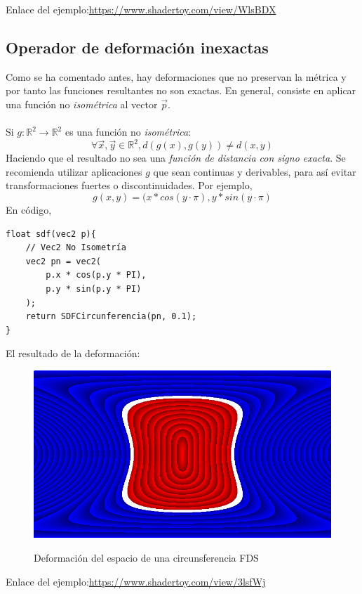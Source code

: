 Enlace del ejemplo:\url{https://www.shadertoy.com/view/WlsBDX}

\subsection{Operador de deformación inexactas}
Como se ha comentado antes, hay deformaciones que no preservan la métrica y por tanto las funciones resultantes no son exactas. En general, consiste en aplicar una función no \textit{isométrica} al vector \(\Vec{p}\).\\\\
Si \(g:\mathbb{R}^2\longrightarrow \mathbb{R}^2\) es una función no \textit{isométrica}:
\[ \forall \Vec{x}, \Vec{y} \in \mathbb{R}^2, d(g(x), g(y)) \neq d(x,y) \]
Haciendo que el resultado no sea una \textit{función de distancia con signo exacta}. Se recomienda utilizar aplicaciones \(g\) que sean continuas y derivables, para así evitar transformaciones fuertes o discontinuidades. Por ejemplo,
\[g(x,y)=(x * cos(y \cdot \pi), y * sin(y \cdot \pi)\]
En código,
\begin{lstlisting}
float sdf(vec2 p){
	// Vec2 No Isometría
	vec2 pn = vec2(
	    p.x * cos(p.y * PI),
	    p.y * sin(p.y * PI)
	);
	return SDFCircunferencia(pn, 0.1);
}
\end{lstlisting}
El resultado de la deformación:
\begin{figure}[H]
  \centering
  \captionsetup{justification=centering}%
  \includegraphics[width=1.0\textwidth]{secciones/imagenes/sdf/2d/sdf_deform.png}\label{fig:deform}
  \caption{Deformación del espacio de una circunsferencia FDS}
\end{figure}

Enlace del ejemplo:\url{https://www.shadertoy.com/view/3lsfWj}

